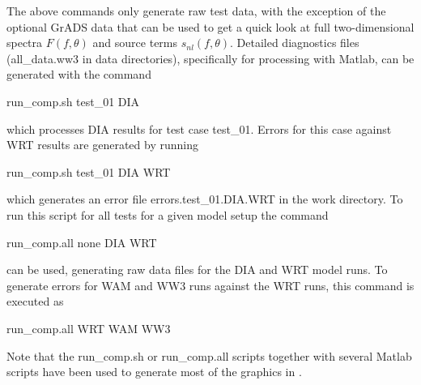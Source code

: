 \documentclass[12pt]{article}
\newcommand{\file}{\sf}
\begin{document}
The above commands only generate raw test data, with the exception of the
optional GrADS data that can be used to get a quick look at full
two-dimensional spectra $F(f,\theta)$ and source terms $s_{nl}(f,\theta)$.
Detailed diagnostics files ({\file all\_data.ww3} in data directories),
specifically for processing with Matlab, can be generated with the command
\begin{center}
{\file run\_comp.sh test\_01 DIA}
\end{center}
\noindent
which processes DIA results for test case {\file test\_01}. Errors for this
case against WRT results are generated by running
\begin{center}
{\file run\_comp.sh test\_01 DIA WRT}
\end{center}
\noindent
which generates an error file {\file errors.test\_01.DIA.WRT} in the work
directory. To run this script for all tests for a given model setup the
command
\begin{center}
{\file run\_comp.all none DIA WRT}
\end{center}
\noindent
can be used, generating raw data files for the DIA and WRT model runs. To
generate errors for WAM and WW3 runs against the WRT runs, this command is
executed as
\begin{center}
{\file run\_comp.all WRT WAM WW3}
\end{center}
\noindent
Note that the {\file run\_comp.sh} or {\file run\_comp.all} scripts together
with several Matlab scripts have been used to generate most of the graphics in
\cite{tol:MMAB10d}.
\end{document}
